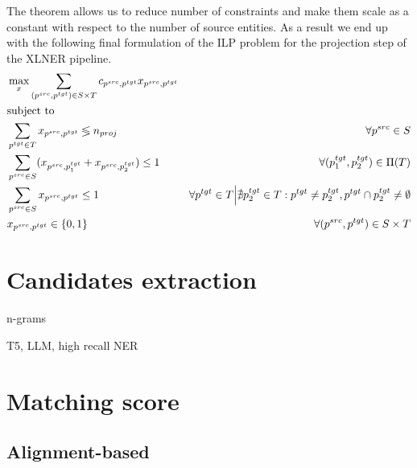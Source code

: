 The theorem allows us to reduce number of constraints and make them scale as a constant
with respect to the number of source entities. As a result we end up with the following final formulation of the ILP problem for the projection step
of the XLNER pipeline.
\begin{equation} \label{eq:ilp}
    \begin{aligned}
         & \max\limits_x \sum\limits_{(p^{src}, p^{tgt}) \in S \times T} c_{p^{src}, p^{tgt}} x_{p^{src}, p^{tgt}}                                                                                                                       \\
         & \text{subject to} \notag                                                                                                                                                                                                      \\
         & \sum\limits_{p^{tgt} \in T} x_{p^{src}, p^{tgt}} \lessgtr n_{proj}                                      & \forall p^{src} \in S                                                                                               \\
         & \sum\limits_{p^{src} \in S} (x_{p^{src}, p_1^{tgt}} + x_{p^{src}, p_2^{tgt}}) \leq 1                    & \forall (p_1^{tgt}, p_2^{tgt}) \in \Pi(T)                                                                           \\
         & \sum\limits_{p^{src} \in S} x_{p^{src}, p^{tgt}} \leq 1                                                 & \forall p^{tgt} \in T \Big| \nexists p_2^{tgt} \in T: p^{tgt} \neq p_2^{tgt}, p^{tgt} \cap p_2^{tgt} \neq \emptyset \\
         & x_{p^{src}, p^{tgt}} \in \{ 0, 1 \}                                                                     & \forall (p^{src}, p^{tgt}) \in S \times T
    \end{aligned}
\end{equation}

\section{Candidates extraction}
n-grams

T5, LLM, high recall NER

\section{Matching score}
\subsection{Alignment-based}


